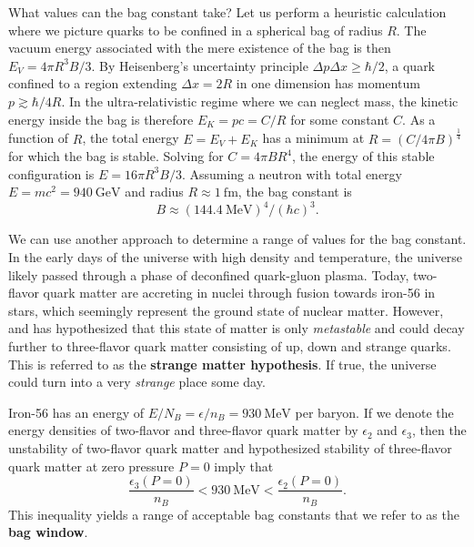 What values can the bag constant take?
Let us perform a heuristic calculation where we picture quarks to be confined in a spherical bag of radius $R$.
The vacuum energy associated with the mere existence of the bag is then $E_V = 4 \pi R^3 B / 3$.
By Heisenberg's uncertainty principle $\Delta p \Delta x \geq \hbar/2$, a quark confined to a region extending $\Delta x = 2R$ in one dimension has momentum $p \gtrsim \hbar/4R$.
In the ultra-relativistic regime where we can neglect mass, the kinetic energy inside the bag is therefore $E_K = pc = C / R$ for some constant $C$.
As a function of $R$, the total energy $E = E_V + E_K$ has a minimum at $R = (C/4 \pi B)^\frac14$ for which the bag is stable.
Solving for $C = 4 \pi B R^4$, the energy of this stable configuration is $E = 16 \pi R^3 B / 3$.
Assuming a neutron with total energy $E = m c^2 = \SI{940}{\giga\electronvolt}$ and radius $R \approx \SI{1}{\femto\meter}$,
the bag constant is
\begin{equation}
	B \approx (\SI{144.4}{\mega\electronvolt})^4 / (\hbar c)^3.
\label{eq:mit:bag_constant_optimal}
\end{equation}

We can use another approach to determine a range of values for the bag constant.
In the early days of the universe with high density and temperature, the universe likely passed through a phase of deconfined quark-gluon plasma.
Today, two-flavor quark matter are accreting in nuclei through fusion towards iron-56 in stars, which seemingly represent the ground state of nuclear matter.
However, \cite{ref:strange_hypothesis_bodmer} and \cite{ref:strange_hypothesis_witten} has hypothesized that this state of matter is only \emph{metastable}
and could decay further to three-flavor quark matter consisting of up, down and strange quarks.
This is referred to as the \textbf{strange matter hypothesis}.
If true, the universe could turn into a very \emph{strange} place some day.

Iron-56 has an energy of $E/N_B = \epsilon/n_B = \SI{930}{\mega\electronvolt}$ per baryon.
If we denote the energy densities of two-flavor and three-flavor quark matter by $\epsilon_2$ and $\epsilon_3$,
then the unstability of two-flavor quark matter and hypothesized stability of three-flavor quark matter at zero pressure $P=0$ imply that
\begin{equation}
	\frac{\epsilon_3(P=0)}{n_B} < \SI{930}{\mega\electronvolt} < \frac{\epsilon_2(P=0)}{n_B} .
\label{eq:mit:bag_stability}
\end{equation}
This inequality yields a range of acceptable bag constants that we refer to as the \textbf{bag window}.

